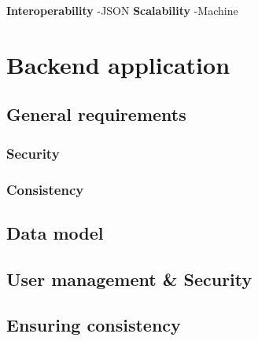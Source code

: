 \textbf{Interoperability}
-JSON
\textbf{Scalability}
-Machine

\section{Backend application}
\subsection{General requirements}
\subsubsection{Security}
\subsubsection{Consistency}
\subsection{}
\subsection{Data model}
\subsection{User management \& Security}
\subsection{Ensuring consistency}